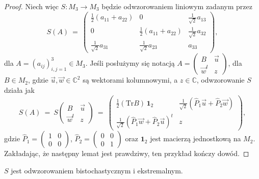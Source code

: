 {\begin{proof}
Niech więc $S\!: M_{3} \rightarrow M_{3}$ będzie odwzorowaniem liniowym
zadanym przez
\begin{equation}
\label{eq:DefinitionOfS}
S(A) \:=\: \begin{pmatrix}
        \frac{1}{2}(a_{11} + a_{22}) & 0 & \frac{1}{\sqrt{2}} a_{13} \\
        0 & \frac{1}{2}(a_{11} + a_{22}) & \frac{1}{\sqrt{2}} a_{32} \\
        \frac{1}{\sqrt{2}} a_{31} & \frac{1}{\sqrt{2}} a_{23} & a_{33}
        \end{pmatrix},
\end{equation}
dla
$A = \left( a_{ij} \right)_{i,j=1}^{3}
        \in M_{3}$.
Jeśli posłużymy się notacją
$A = \left( \begin{smallmatrix}
    B & \vec{u} \\
    \vec{w}^{t} & z
    \end{smallmatrix} \right)$,
dla $B \in M_{2}$, gdzie
$\vec{u},\vec{w} \in \mathbb{C}^{2}$ są wektorami kolumnowymi,
a $z \in \mathbb{C}$,
odwzorowanie $S$ działa jak
\begin{equation}
    S(A) \:=\: S \begin{pmatrix}
    B & \vec{u} \\
    \vec{w}^{t} & z
    \end{pmatrix} \: = \:
    \begin{pmatrix}
        \frac{1}{2} (\text{Tr} B) \, \mathbf{1}_{2} &
            \frac{1}{\sqrt{2}}(\hat{P}_{1} \vec{u} + \hat{P}_{2} \vec{w}) \\
        \frac{1}{\sqrt{2}}(\hat{P}_{1} \vec{w} + \hat{P}_{2} \vec{u})^{t} & z
    \end{pmatrix},
\end{equation}
gdzie
$\hat{P}_{1} = \left( \begin{smallmatrix} 1 & 0 \\ 0 & 0 \end{smallmatrix} \right)$,
$\hat{P}_{2} = \left( \begin{smallmatrix} 0 & 0 \\ 0 & 1 \end{smallmatrix} \right)$
oraz $\mathbf{1}_{2}$ jest macierzą jednostkową na $M_{2}$.
Zakładając, że następny lemat jest prawdziwy,
ten przykład kończy dowód.
\end{proof}


\begin{Lemma}
\label{lem:SIsExtremal}
$S$ jest odwzorowaniem bistochastycznym i ekstremalnym.
\end{Lemma}

}
